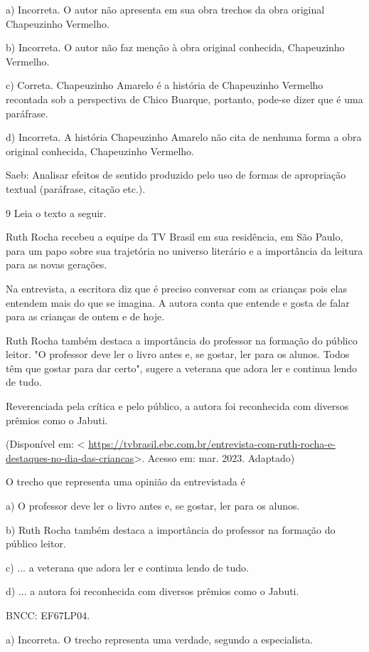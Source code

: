 a) Incorreta. O autor não apresenta em sua obra trechos da obra original
Chapeuzinho Vermelho.

b) Incorreta. O autor não faz menção à obra original conhecida,
Chapeuzinho Vermelho.

c) Correta. Chapeuzinho Amarelo é a história de Chapeuzinho Vermelho
recontada sob a perspectiva de Chico Buarque, portanto, pode-se dizer
que é uma paráfrase.

d) Incorreta. A história Chapeuzinho Amarelo não cita de nenhuma forma a
obra original conhecida, Chapeuzinho Vermelho.

Saeb: Analisar efeitos de sentido produzido pelo uso de formas de
apropriação textual (paráfrase, citação etc.).

\num{9} Leia o texto a seguir.

Ruth Rocha recebeu a equipe da TV Brasil em sua residência, em São
Paulo, para um papo sobre sua trajetória no universo literário e a
importância da leitura para as novas gerações.

Na entrevista, a escritora diz que é preciso conversar com as crianças
pois elas entendem mais do que se imagina. A autora conta que entende e
gosta de falar para as crianças de ontem e de hoje.

Ruth Rocha também destaca a importância do professor na formação do
público leitor. "O professor deve ler o livro antes e, se gostar, ler
para os alunos. Todos têm que gostar para dar certo", sugere a veterana
que adora ler e continua lendo de tudo.

Reverenciada pela crítica e pelo público, a autora foi reconhecida com
diversos prêmios como o Jabuti.

(Disponível em: \textless{}
\url{https://tvbrasil.ebc.com.br/entrevista-com-ruth-rocha-e-destaques-no-dia-das-criancas}\textgreater.
Acesso em: mar. 2023. Adaptado)

O trecho que representa uma opinião da entrevistada é

a) O professor deve ler o livro antes e, se gostar, ler para os alunos.

b) Ruth Rocha também destaca a importância do professor na formação do
público leitor.

c) ... a veterana que adora ler e continua lendo de tudo.

d) ... a autora foi reconhecida com diversos prêmios como o Jabuti.

BNCC: EF67LP04.

a) Incorreta. O trecho representa uma verdade, segundo a especialista.

